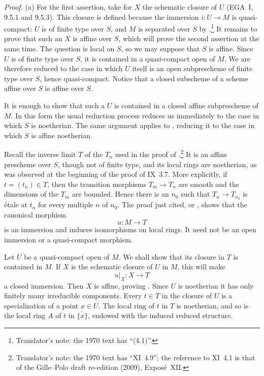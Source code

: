 \emph{Proof.}
\textup{(a)} For the first assertion, take for \(X\) the schematic
closure of \(U\) \textup{(EGA~I, 9.5.1 and 9.5.3)}. This closure is
defined because the immersion \(i:U\to M\) is quasi-compact:
\(U\) is of finite type over \(S\), and \(M\) is separated over
\(S\) by .\footnote{Translator's note: the 1970 text has
``(4.1)''.} It remains to prove that such an \(X\) is affine
over \(S\), which will prove the second assertion at the same time.
The question is local on \(S\), so we may suppose that \(S\) is
affine. Since \(U\) is of finite type over \(S\), it is contained
in a quasi-compact open of \(M\). We are therefore reduced to the
case in which \(U\) itself is an open subprescheme of finite type
over \(S\), hence quasi-compact. Notice that a closed subscheme of a
scheme affine over \(S\) is affine over \(S\).

It is enough to show that such a \(U\) is contained in a closed
affine subprescheme of \(M\). In this form the usual reduction
process reduces us immediately to the case in which \(S\) is
noetherian. The same argument applies to \textup{}, reducing it
to the case in which \(S\) is affine noetherian.

Recall the inverse limit \(T\) of the \(T_n\) used in the proof of
.\footnote{Translator's note: the 1970 text has ``XI~4.9'';
the reference to XI~4.1 is that of the Gille--Polo draft re-edition
(2009), Exposé~XII.} It is an affine prescheme over \(S\), though not of finite
type, and its local rings are noetherian, as was observed at the
beginning of the proof of IX~3.7. More explicitly, if
\(t=(t_n)\in T\), then the transition morphisms \(T_m\to T_n\) are
smooth and the dimensions of the \(T_m\) are bounded. Hence there
is an \(n_0\) such that \(T_n\to T_{n_0}\) is étale at \(t_n\) for
every multiple \(n\) of \(n_0\). The proof just cited, or ,
shows that the canonical morphism
\[
  u:M\longrightarrow T
\]
is an immersion and induces isomorphisms on local rings. It need not
be an open immersion or a quasi-compact morphism.

Let \(U\) be a quasi-compact open of \(M\). We shall show that its
closure in \(T\) is contained in \(M\). If \(X\) is the schematic
closure of \(U\) in \(M\), this will make
\[
  u|_X:X\longrightarrow T
\]
a closed immersion. Then \(X\) is affine, proving \textup{}.
Since \(U\) is noetherian it has only finitely many irreducible
components. Every \(t\in T\) in the closure of \(U\) is a
specialization of a point \(x\in U\). The local ring of \(t\) in
\(T\) is noetherian, and so is the local ring \(A\) of \(t\) in
\(\overline{\{x\}}\), endowed with the induced reduced structure.

